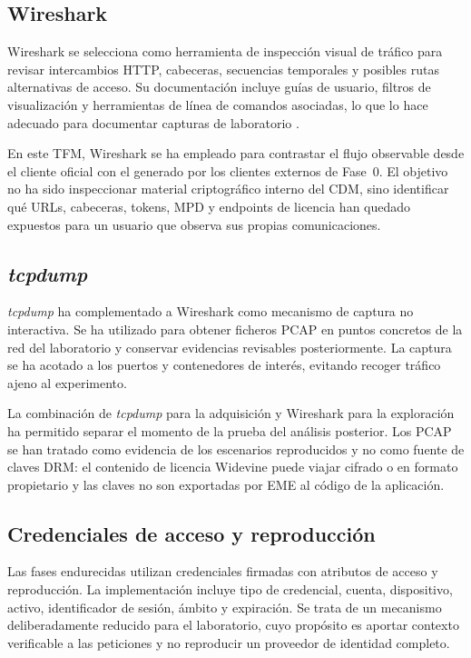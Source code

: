 \subsection{Wireshark}

Wireshark se selecciona como herramienta de inspección visual de tráfico para revisar intercambios HTTP, cabeceras, secuencias temporales y posibles rutas alternativas de acceso. Su documentación incluye guías de usuario, filtros de visualización y herramientas de línea de comandos asociadas, lo que lo hace adecuado para documentar capturas de laboratorio \cite{wireshark-docs2026}.

En este TFM, Wireshark se ha empleado para contrastar el flujo observable desde el cliente oficial con el generado por los clientes externos de Fase~0. El objetivo no ha sido inspeccionar material criptográfico interno del CDM, sino identificar qué URLs, cabeceras, tokens, MPD y endpoints de licencia han quedado expuestos para un usuario que observa sus propias comunicaciones.

\subsection{\textit{tcpdump}}

\textit{tcpdump} ha complementado a Wireshark como mecanismo de captura no interactiva. Se ha utilizado para obtener ficheros PCAP en puntos concretos de la red del laboratorio y conservar evidencias revisables posteriormente. La captura se ha acotado a los puertos y contenedores de interés, evitando recoger tráfico ajeno al experimento.

La combinación de \textit{tcpdump} para la adquisición y Wireshark para la exploración ha permitido separar el momento de la prueba del análisis posterior. Los PCAP se han tratado como evidencia de los escenarios reproducidos y no como fuente de claves DRM: el contenido de licencia Widevine puede viajar cifrado o en formato propietario y las claves no son exportadas por EME al código de la aplicación.

\subsection{Credenciales de acceso y reproducción}

Las fases endurecidas utilizan credenciales firmadas con atributos de acceso y reproducción. La implementación incluye tipo de credencial, cuenta, dispositivo, activo, identificador de sesión, ámbito y expiración. Se trata de un mecanismo deliberadamente reducido para el laboratorio, cuyo propósito es aportar contexto verificable a las peticiones y no reproducir un proveedor de identidad completo.

